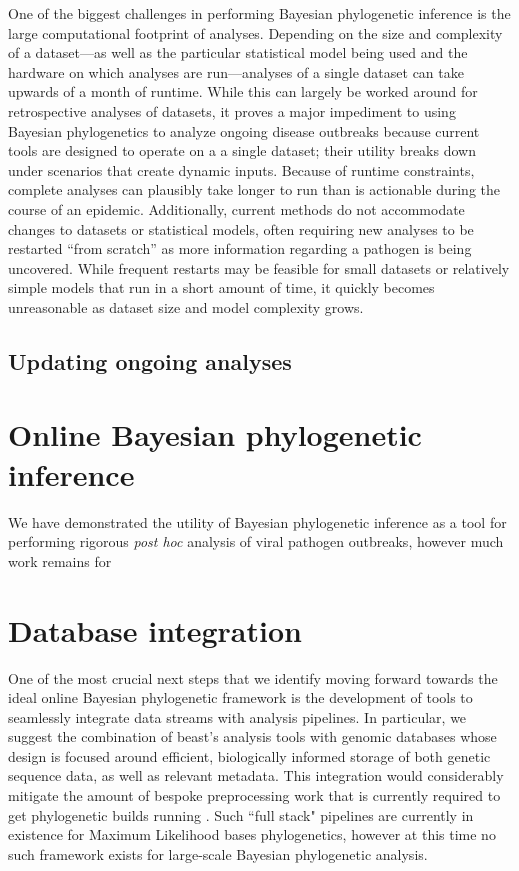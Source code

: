 One of the biggest challenges in performing Bayesian phylogenetic inference is the large computational footprint of analyses.
Depending on the size and complexity of a dataset---as well as the particular statistical model being used and the hardware on which analyses are run---analyses of a single dataset can take upwards of a month of runtime.
While this can largely be worked around for retrospective analyses of datasets, it proves a major impediment to using Bayesian phylogenetics to analyze ongoing disease outbreaks because current tools are designed to operate on a a single dataset; their utility breaks down under scenarios that create dynamic inputs.
Because of runtime constraints, complete analyses can plausibly take longer to run than is actionable during the course of an epidemic.
Additionally, current methods do not accommodate changes to datasets or statistical models, often requiring new analyses to be restarted ``from scratch'' as more information regarding a pathogen is being uncovered.
While frequent restarts may be feasible for small datasets or relatively simple models that run in a short amount of time, it quickly becomes unreasonable as dataset size and model complexity grows.

\subsection{Updating ongoing analyses}

\section{Online Bayesian phylogenetic inference}

We have demonstrated the utility of Bayesian phylogenetic inference as a tool for performing rigorous \textit{post hoc} analysis of viral pathogen outbreaks, however much work remains for

\section{Database integration}

One of the most crucial next steps that we identify moving forward towards the ideal online Bayesian phylogenetic framework is the development of tools to seamlessly integrate data streams with analysis pipelines.
In particular, we suggest the combination of \gls{beast}'s analysis tools with genomic databases whose design is focused around efficient, biologically informed storage of both genetic sequence data, as well as relevant metadata.
This integration would considerably mitigate the amount of bespoke preprocessing work that is currently required to get phylogenetic builds running .
Such ``full stack" pipelines are currently in existence for Maximum Likelihood bases phylogenetics\cite{nextstrain}, however at this time no such framework exists for large-scale Bayesian phylogenetic analysis.

